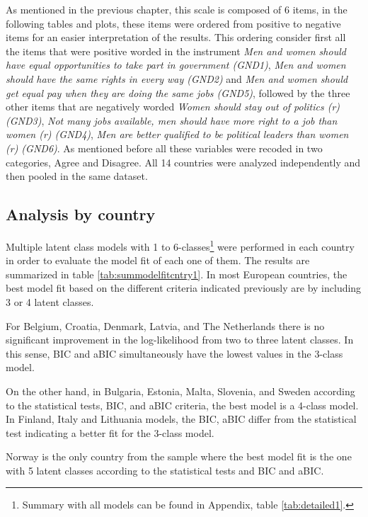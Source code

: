 \documentclass[12pt,a4paper,oneside]{reedthesis}
\begin{document}
As mentioned in the previous chapter, this scale is composed of 6 items, in the following tables and plots, these items were ordered from positive to negative items for an easier interpretation of the results. This ordering consider first all the items that were positive worded in the instrument \emph{Men and women should have equal opportunities to take part in government (GND1)}, \emph{Men and women should have the same rights in every way (GND2)} and \emph{Men and women should get equal pay when they are doing the same jobs (GND5)}, followed by the three other items that are negatively worded \emph{Women should stay out of politics (r) (GND3)}, \emph{Not many jobs available, men should have more right to a job than women (r) (GND4)}, \emph{Men are better qualified to be political leaders than women (r) (GND6)}. As mentioned before all these variables were recoded in two categories, Agree and Disagree. All 14 countries were analyzed independently and then pooled in the same dataset.

\hypertarget{analysis-by-country}{%
\subsection{Analysis by country}\label{analysis-by-country}}

Multiple latent class models with 1 to 6-classes\footnote{Summary with all models can be found in Appendix, table \ref{tab:detailed1}.} were performed in each country in order to evaluate the model fit of each one of them. The results are summarized in table \ref{tab:summodelfitcntry1}. In most European countries, the best model fit based on the different criteria indicated previously are by including 3 or 4 latent classes.

For Belgium, Croatia, Denmark, Latvia, and The Netherlands there is no significant improvement in the log-likelihood from two to three latent classes. In this sense, BIC and aBIC simultaneously have the lowest values in the 3-class model.

On the other hand, in Bulgaria, Estonia, Malta, Slovenia, and Sweden according to the statistical tests, BIC, and aBIC criteria, the best model is a 4-class model. In Finland, Italy and Lithuania models, the BIC, aBIC differ from the statistical test indicating a better fit for the 3-class model.

Norway is the only country from the sample where the best model fit is the one with 5 latent classes according to the statistical tests and BIC and aBIC.
\end{document}
